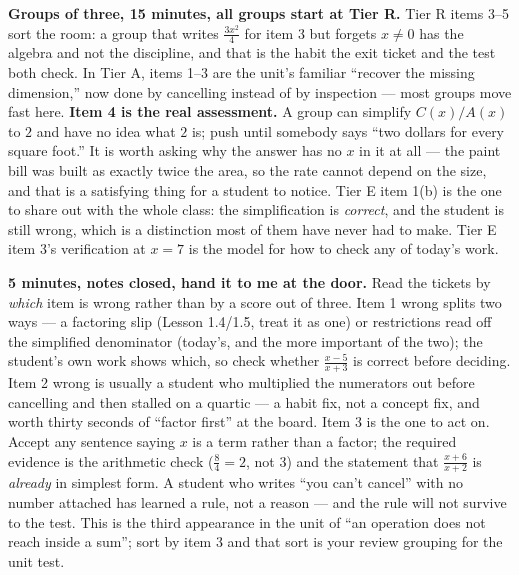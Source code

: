 \documentclass[10pt]{article}
\begin{document}
\begin{teachernote}
    \textbf{Groups of three, 15 minutes, all groups start at Tier R.} Tier R items 3--5 sort the
    room: a group that writes $\tfrac{3x^2}{4}$ for item 3 but forgets $x \ne 0$ has the algebra and
    not the discipline, and that is the habit the exit ticket and the test both check. In Tier A,
    items 1--3 are the unit's familiar ``recover the missing dimension,'' now done by cancelling
    instead of by inspection --- most groups move fast here. \textbf{Item 4 is the real
    assessment.} A group can simplify $C(x)/A(x)$ to $2$ and have no idea what $2$ is; push until
    somebody says ``two dollars for every square foot.'' It is worth asking why the answer has no
    $x$ in it at all --- the paint bill was built as exactly twice the area, so the rate cannot
    depend on the size, and that is a satisfying thing for a student to notice. Tier E item 1(b) is
    the one to share out with the whole class: the simplification is \emph{correct}, and the student
    is still wrong, which is a distinction most of them have never had to make. Tier E item 3's
    verification at $x=7$ is the model for how to check any of today's work.
\end{teachernote}

\begin{teachernote}
    \textbf{5 minutes, notes closed, hand it to me at the door.} Read the tickets by \emph{which}
    item is wrong rather than by a score out of three. Item 1 wrong splits two ways --- a factoring
    slip (Lesson 1.4/1.5, treat it as one) or restrictions read off the simplified denominator
    (today's, and the more important of the two); the student's own work shows which, so check
    whether $\tfrac{x-5}{x+3}$ is correct before deciding. Item 2 wrong is usually a student who
    multiplied the numerators out before cancelling and then stalled on a quartic --- a habit fix,
    not a concept fix, and worth thirty seconds of ``factor first'' at the board. Item 3 is the one
    to act on. Accept any sentence saying $x$ is a term rather than a factor; the required evidence
    is the arithmetic check ($\tfrac84 = 2$, not $3$) and the statement that
    $\tfrac{x+6}{x+2}$ is \emph{already} in simplest form. A student who writes ``you can't cancel''
    with no number attached has learned a rule, not a reason --- and the rule will not survive to
    the test. This is the third appearance in the unit of ``an operation does not reach inside a
    sum''; sort by item 3 and that sort is your review grouping for the unit test.
\end{teachernote}
\end{document}
